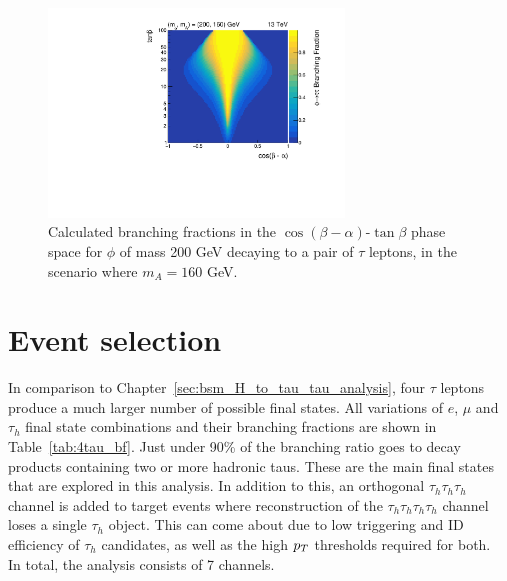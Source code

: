 \begin{figure}[!hbtp]
\centering
    \includegraphics[width=0.7\textwidth]{Figures/phi_branching_fractions_mphi200_mA160.pdf}
\caption{Calculated branching fractions in the $\cos(\beta-\alpha)$-$\tan\beta$ phase space for $\phi$ of mass 200 GeV decaying to a pair of $\tau$ leptons, in the scenario where $m_A = 160$ GeV.}
\label{fig:4tau_br_2d}
\end{figure}

\section{Event selection}

In comparison to Chapter~\ref{sec:bsm_H_to_tau_tau_analysis}, four $\tau$ leptons produce a much larger number of possible final states. 
All variations of $e$, $\mu$ and $\tau_h$ final state combinations and their branching fractions are shown in Table~\ref{tab:4tau_bf}.
Just under 90\% of the branching ratio goes to decay products containing two or more hadronic taus.
These are the main final states that are explored in this analysis. 
In addition to this, an orthogonal $\tau_h \tau_h \tau_h$ channel is added to target events where reconstruction of the $\tau_h \tau_h \tau_h \tau_h$ channel loses a single $\tau_h$ object.
This can come about due to low triggering and ID efficiency of $\tau_h$ candidates, as well as the high $p_{T}$ thresholds required for both. \\
In total, the analysis consists of 7 channels.

